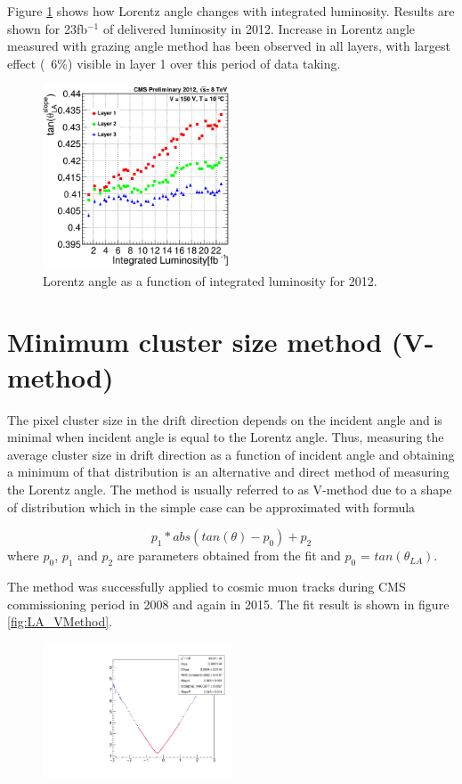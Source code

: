 Figure \ref{fig:La2012} shows how Lorentz angle changes with integrated luminosity. Results are shown for 23fb$^{-1}$ of delivered luminosity in 2012. Increase in Lorentz angle measured with grazing angle method has been observed in all layers, with largest effect (~6\%) visible in layer 1 over this period of data taking.  
\begin{figure}[ht!]
\centering
\includegraphics[width=0.5\textwidth]{Figures/LA2012.png}
\caption{Lorentz angle as a function of integrated luminosity for 2012.}
\label{fig:La2012}
\end{figure}

\section{Minimum cluster size method (V-method)}
The pixel cluster size in the drift direction depends on the incident
angle and is minimal when incident angle is equal to the Lorentz angle. Thus, measuring the average cluster size in drift direction as a function of incident angle and obtaining a minimum of that
distribution is an alternative and direct method of measuring the Lorentz angle. The method is usually referred to as V-method due
to a shape of distribution which in the simple case can be approximated with formula

\begin{equation}
p_1*abs(tan(\theta) - p_0) + p_2
\end{equation}
where $p_0$, $p_1$ and $p_2$ are parameters obtained from the fit and $p_0$ = $tan(\theta_{LA})$.

The method was successfully applied to cosmic muon tracks during CMS commissioning period in 2008 and again in 2015. The fit result is shown in figure \ref{fig:LA_VMethod}.

\begin{figure}[hbtp!]
	\centering
	\includegraphics[width=0.5\textwidth]{Figures/LA_VMethod_2015.pdf}
\end{figure}

